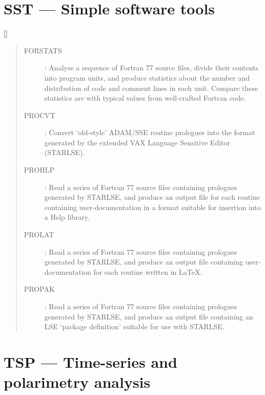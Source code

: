 \newpage

\section{SST --- Simple software tools}

\vspace{-10mm}

\hfill []

\vspace{2mm}

\begin{quote}
\begin{description}
\item [FORSTATS] : Analyse a sequence of Fortran 77 source files, divide
 their contents into program units, and produce statistics about the number
 and distribution of code and comment lines in each unit.
 Compare these statistics are with typical values from well-crafted Fortran
 code.

\item [PROCVT] : Convert `old-style' ADAM/SSE routine prologues into the
 format generated by the extended VAX Language Sensitive Editor (STARLSE).

\item [PROHLP] : Read a series of Fortran 77 source files containing
 prologues generated by STARLSE, and produce an output file for each routine
 containing user-documentation in a format suitable for insertion into
 a Help library.

\item [PROLAT] : Read a series of Fortran 77 source files containing
 prologues generated by STARLSE, and produce an output file containing
 user-documentation for each routine written in \LaTeX.

\item [PROPAK] : Read a series of Fortran 77 source files containing
 prologues generated by STARLSE, and produce an output file containing
 an LSE `package definition' suitable for use with STARLSE.

\end{description}
\end{quote}

\newpage

\section{TSP --- Time-series and polarimetry analysis}

